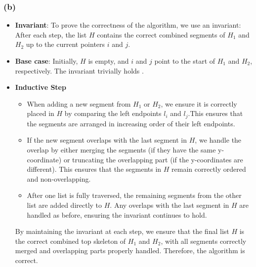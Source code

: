 \documentclass[12pt]{article}
\begin{document}
        \subsubsection*{(b)}
            \begin{itemize}

                \item \textbf{Invariant}: To prove the correctness of the algorithm, we use an invariant: After each step, the list \( H \) contains the correct combined segments of \( H_1 \) and \( H_2 \) up to the current pointers \( i \) and \( j \).

                \item \textbf{Base case}: Initially, \( H \) is empty, and \( i \) and \( j \) point to the start of \( H_1 \) and \( H_2 \), respectively. The invariant trivially holds .

                \item \textbf{Inductive Step}

                \begin{itemize}
                    \item When adding a new segment from \( H_1 \) or \( H_2 \), we ensure it is correctly placed in \( H \) by comparing the left endpoints \( l_i \) and \( l_j \).This ensures that the segments are arranged in increasing order of their left endpoints.
                    \item If the new segment overlaps with the last segment in \( H \), we handle the overlap by either merging the segments (if they have the same y-coordinate) or truncating the overlapping part (if the y-coordinates are different). This ensures that the segments in \( H \) remain correctly ordered and non-overlapping.
                    \item After one list is fully traversed, the remaining segments from the other list are added directly to \( H \). Any overlaps with the last segment in \( H \) are handled as before, ensuring the invariant continues to hold.
                \end{itemize}

                By maintaining the invariant at each step, we ensure that the final list \( H \) is the correct combined top skeleton of \( H_1 \) and \( H_2 \), with all segments correctly merged and overlapping parts properly handled. Therefore, the algorithm is correct.

            \end{itemize}
\end{document}
